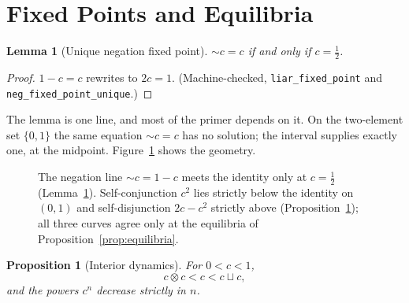 \documentclass[11pt,a4paper]{article}
\newtheorem{lemma}[theorem]{Lemma}
\newtheorem{proposition}[theorem]{Proposition}
\newcommand{\negc}{\mathord{\sim}}
\newcommand{\conjc}{\otimes}
\newcommand{\disjc}{\sqcup}
\begin{document}
\section{Fixed Points and Equilibria}
\label{sec:fixed}

\begin{lemma}[Unique negation fixed point]
\label{lem:fixed}
$\negc c = c$ if and only if $c = \tfrac{1}{2}$.
\end{lemma}

\begin{proof}
$1 - c = c$ rewrites to $2c = 1$.
(Machine-checked, \texttt{liar\_fixed\_point} and
\texttt{neg\_fixed\_point\_unique}.)
\end{proof}

The lemma is one line, and most of the primer depends on it.
On the two-element set $\{0,1\}$ the same equation $\negc c = c$ has
no solution; the interval supplies exactly one, at the midpoint.
Figure~\ref{fig:negation} shows the geometry.

\begin{figure}[ht]
\centering
{}
\caption{The negation line $\negc c = 1 - c$ meets the identity only
at $c = \tfrac{1}{2}$ (Lemma~\ref{lem:fixed}).
Self-conjunction $c^2$ lies strictly below the identity on $(0,1)$
and self-disjunction $2c - c^2$ strictly above
(Proposition~\ref{prop:dynamics}); all three curves agree only at the
equilibria of Proposition~\ref{prop:equilibria}.}
\label{fig:negation}
\end{figure}

\begin{proposition}[Interior dynamics]
\label{prop:dynamics}
For $0 < c < 1$,
\[
c \conjc c < c < c \disjc c,
\]
and the powers $c^{n}$ decrease strictly in $n$.
\end{proposition}
\end{document}
